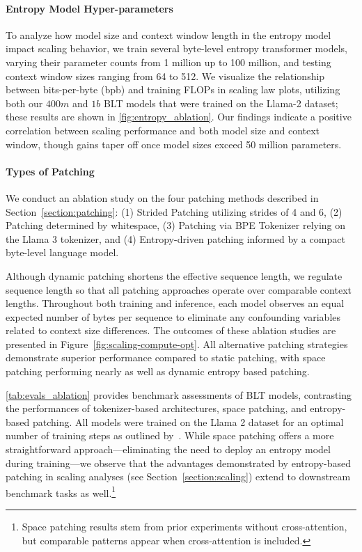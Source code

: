 \paragraph{Entropy Model Hyper-parameters} To analyze how model size and context window length in the entropy model impact scaling behavior, we train several byte-level entropy transformer models, varying their parameter counts from 1 million up to 100 million, and testing context window sizes ranging from 64 to 512. We visualize the relationship between bits-per-byte (bpb) and training FLOPs in scaling law plots, utilizing both our $400m$ and $1b$ {\textsc BLT} models that were trained on the Llama-2 dataset; these results are shown in \autoref{fig:entropy_ablation}. Our findings indicate a positive correlation between scaling performance and both model size and context window, though gains taper off once model sizes exceed 50 million parameters.

\paragraph{Types of Patching}

We conduct an ablation study on the four patching methods described in Section~\ref{section:patching}: (1) Strided Patching utilizing strides of 4 and 6, (2) Patching determined by whitespace, (3) Patching via BPE Tokenizer relying on the Llama 3 tokenizer, and (4) Entropy-driven patching informed by a compact byte-level language model.

Although dynamic patching shortens the effective sequence length, we regulate sequence length so that all patching approaches operate over comparable context lengths. Throughout both training and inference, each model observes an equal expected number of bytes per sequence to eliminate any confounding variables related to context size differences. The outcomes of these ablation studies are presented in Figure~\ref{fig:scaling-compute-opt}. All alternative patching strategies demonstrate superior performance compared to static patching, with space patching performing nearly as well as dynamic entropy based patching.

\autoref{tab:evals_ablation} provides benchmark assessments of {\textsc BLT} models, contrasting the performances of tokenizer-based architectures, space patching, and entropy-based patching. All models were trained on the Llama 2 dataset for an optimal number of training steps as outlined by~\citet{dubey2024llama}. While space patching offers a more straightforward approach—eliminating the need to deploy an entropy model during training—we observe that the advantages demonstrated by entropy-based patching in scaling analyses (see Section~\ref{section:scaling}) extend to downstream benchmark tasks as well.\footnote{Space patching results stem from prior experiments without cross-attention, but comparable patterns appear when cross-attention is included.}


